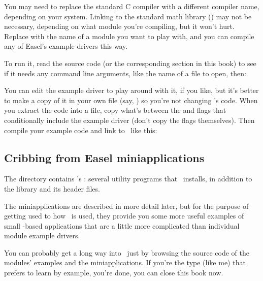 You may need to replace the standard C compiler  with a
different compiler name, depending on your system. Linking to the
standard math library () may not be necessary, depending on
what module you're compiling, but it won't hurt. Replace 
with the name of a module you want to play with, and you can compile
any of Easel's example drivers this way.

To run it, read the source code (or the corresponding section in this
book) to see if it needs any command line arguments, like the name of
a file to open, then:

\begin{cchunk}
\end{cchunk}

You can edit the example driver to play around with it, if you like,
but it's better to make a copy of it in your own file (say,
) so you're not changing \Easel's code. When you
extract the code into a file, copy what's between the  and  flags that
conditionally include the example driver (don't copy the flags
themselves). Then compile your example code and link to \Easel\ like
this:

\begin{cchunk}
\end{cchunk}

\subsection{Cribbing from Easel miniapplications}

The  directory contains \Easel's
: several utility programs that \Easel\
installs, in addition to the library  and its header
files.

The miniapplications are described in more detail later, but for the
purpose of getting used to how \Easel\ is used, they provide you some
more useful examples of small \Easel-based applications that are a
little more complicated than individual module example drivers.

You can probably get a long way into \Easel\ just by browsing the
source code of the modules' examples and the miniapplications. If
you're the type (like me) that prefers to learn by example, you're
done, you can close this book now. 



